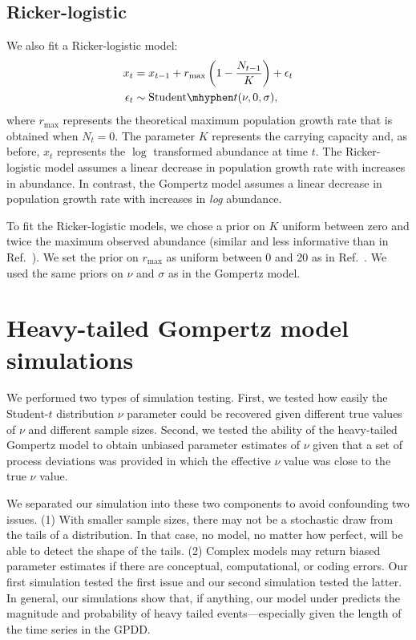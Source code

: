 \documentclass[12pt]{article}
\begin{document}
\subsection{Ricker-logistic} We also fit a Ricker-logistic model:
\begin{align}
x_t &= x_{t-1} + r_{\mathrm{max}}\left(1 - \frac{N_{t-1}}{K}\right) + \epsilon_t\\
\epsilon_t &\sim \mathrm{Student}\mhyphen t(\nu, 0, \sigma),
\end{align}
where \(r_\mathrm{max}\) represents the theoretical maximum population growth
rate that is obtained when \(N_t = 0\). The parameter \(K\) represents the
carrying capacity and, as before, \(x_t\) represents the \(\log\) transformed
abundance at time \(t\). The Ricker-logistic model assumes a linear decrease in
population growth rate with increases in abundance. In contrast, the Gompertz
model assumes a linear decrease in population growth rate with increases in
\textit{log} abundance.

To fit the Ricker-logistic models, we chose a prior on \(K\) uniform between
zero and twice the maximum observed abundance (similar and less informative
than in Ref.~\cite{delean2013}). We set the prior on
\(r_\mathrm{max}\) as uniform between 0 and 20 as in Ref.~\cite{delean2013}.
We used the same priors on \(\nu\) and \(\sigma\) as in
the Gompertz model.


\section{Heavy-tailed Gompertz model simulations}

We performed two types of simulation testing.
First, we tested how easily the Student-$t$ distribution \(\nu\) parameter could
be recovered given different true values of \(\nu\) and different sample sizes.
Second, we tested the ability of the heavy-tailed Gompertz model to obtain
unbiased parameter estimates of \(\nu\) given that a set of process deviations
was provided in which the effective \(\nu\) value was close to the true \(\nu\)
value.

We separated our simulation into these two components to avoid confounding two
issues. (1) With smaller sample sizes, there may not be a stochastic draw from
the tails of a distribution. In that case, no model, no matter how perfect,
will be able to detect the shape of the tails. (2) Complex models may return
biased parameter estimates if there are conceptual, computational, or coding
errors. Our first simulation tested the first issue and our second simulation
tested the latter. In general, our simulations show that, if anything, our
model under predicts the magnitude and probability of heavy tailed
events---especially given the length of the time series in the GPDD.
\end{document}
